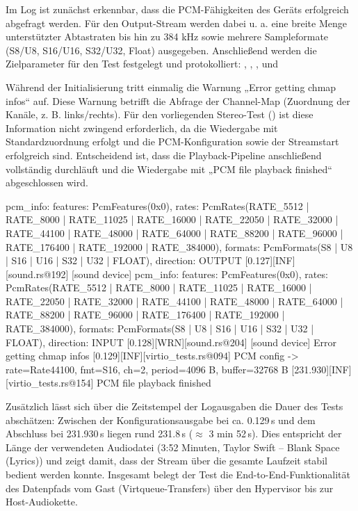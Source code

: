 Im Log ist zunächst erkennbar, dass die PCM-Fähigkeiten des Geräts erfolgreich abgefragt werden. Für den Output-Stream werden dabei u. a. eine breite Menge unterstützter Abtastraten bis hin zu 384 kHz sowie mehrere Sampleformate (S8/U8, S16/U16, S32/U32, Float) ausgegeben. Anschließend werden die Zielparameter für den Test festgelegt und protokolliert: , , ,  und 

Während der Initialisierung tritt einmalig die Warnung „Error getting chmap infos“ auf. Diese Warnung betrifft die Abfrage der Channel-Map (Zuordnung der Kanäle, z. B. links/rechts). Für den vorliegenden Stereo-Test () ist diese Information nicht zwingend erforderlich, da die Wiedergabe mit Standardzuordnung erfolgt und die PCM-Konfiguration sowie der Streamstart erfolgreich sind. Entscheidend ist, dass die Playback-Pipeline anschließend vollständig durchläuft und die Wiedergabe mit „PCM file playback finished“ abgeschlossen wird.

\begin{terminalblock}
  \begin{textcode}
 pcm_info: features: PcmFeatures(0x0), rates: PcmRates(RATE_5512 | RATE_8000 | RATE_11025 | RATE_16000 | RATE_22050 | RATE_32000 | RATE_44100 | RATE_48000 | RATE_64000 | RATE_88200 | RATE_96000 | RATE_176400 | RATE_192000 | RATE_384000), formats: PcmFormats(S8 | U8 | S16 | U16 | S32 | U32 | FLOAT), direction: OUTPUT
[0.127][INF][sound.rs@192] [sound device] pcm_info: features: PcmFeatures(0x0), rates: PcmRates(RATE_5512 | RATE_8000 | RATE_11025 | RATE_16000 | RATE_22050 | RATE_32000 | RATE_44100 | RATE_48000 | RATE_64000 | RATE_88200 | RATE_96000 | RATE_176400 | RATE_192000 | RATE_384000), formats: PcmFormats(S8 | U8 | S16 | U16 | S32 | U32 | FLOAT), direction: INPUT
[0.128][WRN][sound.rs@204] [sound device] Error getting chmap infos
[0.129][INF][virtio_tests.rs@094] PCM config -> rate=Rate44100, fmt=S16, ch=2, period=4096 B, buffer=32768 B
[231.930][INF][virtio_tests.rs@154] PCM file playback finished
  \end{textcode}
\end{terminalblock}

Zusätzlich lässt sich über die Zeitstempel der Logausgaben die Dauer des Tests abschätzen: Zwischen der Konfigurationsausgabe bei ca. 0.129\,s und dem Abschluss bei 231.930\,s liegen rund 231.8\,s ($\approx$ 3 min 52\,s). Dies entspricht der Länge der verwendeten Audiodatei (3:52 Minuten, Taylor Swift – Blank Space (Lyrics)\cite{YoutubeBlankSpace}) und zeigt damit, dass der Stream über die gesamte Laufzeit stabil bedient werden konnte. Insgesamt belegt der Test die End-to-End-Funktionalität des Datenpfads vom Gast (Virtqueue-Transfers) über den Hypervisor bis zur Host-Audiokette.

